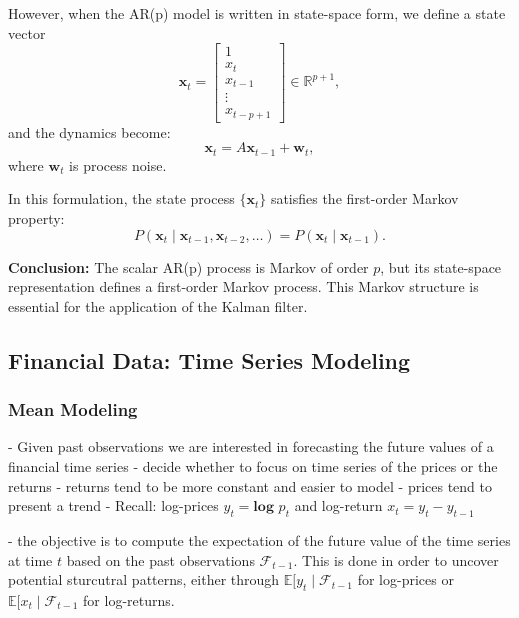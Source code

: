 However, when the AR(p) model is written in state-space form, we define a state vector
\[
\mathbf{x}_t =
\begin{bmatrix}
1 \\
x_t \\
x_{t-1} \\
\vdots \\
x_{t-p+1}
\end{bmatrix}
\in \mathbb{R}^{p+1},
\]
and the dynamics become:
\[
\mathbf{x}_t = A \mathbf{x}_{t-1} + \mathbf{w}_t,
\]
where \(\mathbf{w}_t\) is process noise.

In this formulation, the state process \(\{\mathbf{x}_t\}\) satisfies the first-order Markov property:
\[
P(\mathbf{x}_t \mid \mathbf{x}_{t-1}, \mathbf{x}_{t-2}, \dots) = P(\mathbf{x}_t \mid \mathbf{x}_{t-1}).
\]

\textbf{Conclusion:} The scalar AR(p) process is Markov of order \(p\), but its state-space representation defines a first-order Markov process. This Markov structure is essential for the application of the Kalman filter.



\subsection{Financial Data: Time Series Modeling}
\subsubsection{Mean Modeling}
- Given past observations we are interested in forecasting the future values of a financial time series
- decide whether to focus on time series of the prices or the returns
- returns tend to be more constant and easier to model 
- prices tend to present a trend 
- Recall: log-prices $y_t=\textbf{log }p_t$ and log-return $x_t= y_t-y_{t-1}$

- the objective is to compute the expectation of the future value of the time series at time $t$ based on the past observations $\mathcal{F}_{t-1}$. This is done in order to uncover potential sturcutral patterns, either through $\mathbb{E}[y_t \mid \mathcal{F}_{t-1}$ for log-prices or $\mathbb{E}[x_t \mid \mathcal{F}_{t-1}$ for log-returns. 